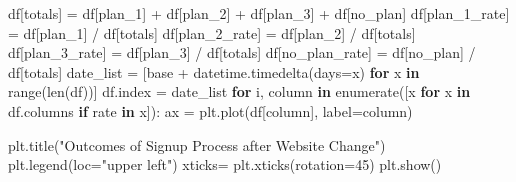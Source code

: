 \documentclass[]{tufte-book}
\newenvironment{Shaded}{}{}
\newcommand{\BuiltInTok}[1]{#1}
\newcommand{\ControlFlowTok}[1]{\textcolor[rgb]{0.00,0.44,0.13}{\textbf{#1}}}
\newcommand{\DecValTok}[1]{\textcolor[rgb]{0.25,0.63,0.44}{#1}}
\newcommand{\KeywordTok}[1]{\textcolor[rgb]{0.00,0.44,0.13}{\textbf{#1}}}
\newcommand{\NormalTok}[1]{#1}
\newcommand{\OperatorTok}[1]{\textcolor[rgb]{0.40,0.40,0.40}{#1}}
\newcommand{\StringTok}[1]{\textcolor[rgb]{0.25,0.44,0.63}{#1}}
\theoremstyle{definition}
\theoremstyle{definition}
\theoremstyle{definition}
\theoremstyle{remark}
\begin{document}
\begin{Shaded}
\begin{Highlighting}[]
\NormalTok{df[}\StringTok{\textquotesingle{}totals\textquotesingle{}}\NormalTok{] }\OperatorTok{=}\NormalTok{ df[}\StringTok{\textquotesingle{}plan\_1\textquotesingle{}}\NormalTok{] }\OperatorTok{+}\NormalTok{ df[}\StringTok{\textquotesingle{}plan\_2\textquotesingle{}}\NormalTok{] }\OperatorTok{+}\NormalTok{ df[}\StringTok{\textquotesingle{}plan\_3\textquotesingle{}}\NormalTok{] }\OperatorTok{+}\NormalTok{ df[}\StringTok{\textquotesingle{}no\_plan\textquotesingle{}}\NormalTok{]}
\NormalTok{df[}\StringTok{\textquotesingle{}plan\_1\_rate\textquotesingle{}}\NormalTok{] }\OperatorTok{=}\NormalTok{ df[}\StringTok{\textquotesingle{}plan\_1\textquotesingle{}}\NormalTok{] }\OperatorTok{/}\NormalTok{ df[}\StringTok{\textquotesingle{}totals\textquotesingle{}}\NormalTok{]}
\NormalTok{df[}\StringTok{\textquotesingle{}plan\_2\_rate\textquotesingle{}}\NormalTok{] }\OperatorTok{=}\NormalTok{ df[}\StringTok{\textquotesingle{}plan\_2\textquotesingle{}}\NormalTok{] }\OperatorTok{/}\NormalTok{ df[}\StringTok{\textquotesingle{}totals\textquotesingle{}}\NormalTok{]}
\NormalTok{df[}\StringTok{\textquotesingle{}plan\_3\_rate\textquotesingle{}}\NormalTok{] }\OperatorTok{=}\NormalTok{ df[}\StringTok{\textquotesingle{}plan\_3\textquotesingle{}}\NormalTok{] }\OperatorTok{/}\NormalTok{ df[}\StringTok{\textquotesingle{}totals\textquotesingle{}}\NormalTok{]}
\NormalTok{df[}\StringTok{\textquotesingle{}no\_plan\_rate\textquotesingle{}}\NormalTok{] }\OperatorTok{=}\NormalTok{ df[}\StringTok{\textquotesingle{}no\_plan\textquotesingle{}}\NormalTok{] }\OperatorTok{/}\NormalTok{ df[}\StringTok{\textquotesingle{}totals\textquotesingle{}}\NormalTok{]}
\NormalTok{date\_list }\OperatorTok{=}\NormalTok{ [base }\OperatorTok{+}\NormalTok{ datetime.timedelta(days}\OperatorTok{=}\NormalTok{x) }\ControlFlowTok{for}\NormalTok{ x }\KeywordTok{in} \BuiltInTok{range}\NormalTok{(}\BuiltInTok{len}\NormalTok{(df))]}
\NormalTok{df.index }\OperatorTok{=}\NormalTok{ date\_list}
\ControlFlowTok{for}\NormalTok{ i, column }\KeywordTok{in} \BuiltInTok{enumerate}\NormalTok{([x }\ControlFlowTok{for}\NormalTok{ x }\KeywordTok{in}\NormalTok{ df.columns }\ControlFlowTok{if} \StringTok{\textquotesingle{}rate\textquotesingle{}} \KeywordTok{in}\NormalTok{ x]):}
\NormalTok{    ax }\OperatorTok{=}\NormalTok{ plt.plot(df[column], label}\OperatorTok{=}\NormalTok{column)}

\NormalTok{plt.title(}\StringTok{"Outcomes of Signup Process after Website Change"}\NormalTok{)}
\NormalTok{plt.legend(loc}\OperatorTok{=}\StringTok{"upper left"}\NormalTok{)}
\NormalTok{xticks}\OperatorTok{=}\NormalTok{ plt.xticks(rotation}\OperatorTok{=}\DecValTok{45}\NormalTok{)}
\NormalTok{plt.show()}
\end{Highlighting}
\end{Shaded}
\end{document}
